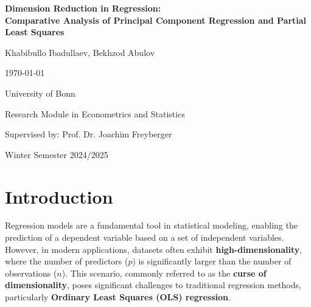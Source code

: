 \documentclass[11pt,twoside,a4paper]{article}
\begin{document}
\begin{titlepage}
    \centering
    {\LARGE\bfseries Dimension Reduction in Regression: \\ Comparative Analysis of Principal Component Regression and Partial Least Squares\par}
    \vspace{1.5cm}
    
    {\Large Khabibullo Ibadullaev, Bekhzod Abulov\par}
    \vspace{0.5cm}
    
    {\large \today\par}
    \vspace{3cm}
    
    {\large University of Bonn\par}
    {\large Research Module in Econometrics and Statistics\par}
    {\large Supervised by: Prof. Dr. Joachim Freyberger\par}
    
    \vspace{0.5cm}
    
    {\large Winter Semester 2024/2025\par}
\end{titlepage}

\newpage

\thispagestyle{empty}
\tableofcontents

\newpage

\setlength{\abovedisplayskip}{0.35cm}
\setlength{\belowdisplayskip}{0.35cm}

\setlength{\abovedisplayshortskip}{0.2cm}
\setlength{\belowdisplayshortskip}{0.35cm}
\setlength{\parskip}{0.5em}

\section{Introduction}

Regression models are a fundamental tool in statistical modeling, enabling the prediction of a dependent variable based on a set of independent variables. However, in modern applications, datasets often exhibit \textbf{high-dimensionality}, where the number of predictors (\( p \)) is significantly larger than the number of observations (\( n \)). This scenario, commonly referred to as the \textbf{curse of dimensionality}, poses significant challenges to traditional regression methods, particularly \textbf{Ordinary Least Squares (OLS) regression}.
\end{document}
